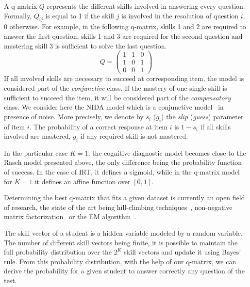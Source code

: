 \documentclass{edm_template}
\begin{document}
A q-matrix $Q$ \cite{Tatsuoka1983} represents the different skills involved in answering every question. Formally, $Q_{ij}$ is equal to 1 if the skill $j$ is involved in the resolution of question $i$, 0 otherwise. For example, in the following q-matrix, skills 1 and 2 are required to answer the first question, skills 1 and 3 are required for the second question and mastering skill 3 is sufficient to solve the last question.
\[ Q = \left(\begin{array}{lll}
1 & 1 & 0\\
1 & 0 & 1\\
0 & 0 & 1
\end{array}\right) \]
If all involved skills are necessary to succeed at corresponding item, the model is considered part of the \emph{conjunctive} class. 
If the mastery of one single skill is sufficient to succeed the item, it will be considered part of the \emph{compensatory} class. We consider here the NIDA model which is a conjunctive model~\cite{Desmarais2012} in presence of noise. More precisely, we denote by $s_i$ ($g_i$) the \emph{slip} (\emph{guess}) parameter of item $i$. The probability of a correct response at item $i$ is $1 - s_i$ if all skills involved are mastered, $g_i$ if any required skill is not mastered.

In the particular case $K=1$, the cognitive diagnostic model becomes close to the Rasch model presented above, the only difference being the probability function of success. In the case of IRT, it defines a sigmoid, while in the q-matrix model for $K = 1$ it defines an affine function over $[0,1]$.

Determining the best q-matrix that fits a given dataset is currently an open field of research, the state of the art being hill-climbing techniques~\cite{Barnes2005}, non-negative matrix factorization~\cite{Desmarais2011} or the EM algorithm~\cite{Huebner2010}. 

The skill vector of a student is a hidden variable modeled by a random variable. The number of different skill vectors being finite, it is possible to maintain the full probability distribution over the $2^K$ skill vectors and update it using Bayes' rule. From this probability distribution, with the help of our q-matrix, we can derive the probability for a given student to answer correctly any question of the test.

\end{document}
